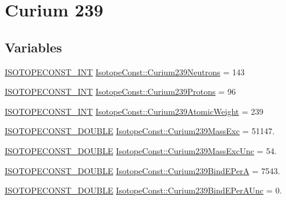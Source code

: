\hypertarget{group___isotope_const-_curium-_cm239}{}\section{Curium 239}
\label{group___isotope_const-_curium-_cm239}
\subsection*{Variables}
\begin{DoxyCompactItemize}
\item 
\mbox{\hyperlink{group___isotope_const-_macros_ga5f18360b3e99483a35c32d789e62621c}{I\+S\+O\+T\+O\+P\+E\+C\+O\+N\+S\+T\+\_\+\+I\+NT}} \mbox{\hyperlink{group___isotope_const-_curium-_cm239_ga4d16c2e40a65487af7b28052aaa3e91a}{Isotope\+Const\+::\+Curium239\+Neutrons}} = 143
\item 
\mbox{\hyperlink{group___isotope_const-_macros_ga5f18360b3e99483a35c32d789e62621c}{I\+S\+O\+T\+O\+P\+E\+C\+O\+N\+S\+T\+\_\+\+I\+NT}} \mbox{\hyperlink{group___isotope_const-_curium-_cm239_gae6e16ea3bcd3d07f73e7ccc0e0e9c6c1}{Isotope\+Const\+::\+Curium239\+Protons}} = 96
\item 
\mbox{\hyperlink{group___isotope_const-_macros_ga5f18360b3e99483a35c32d789e62621c}{I\+S\+O\+T\+O\+P\+E\+C\+O\+N\+S\+T\+\_\+\+I\+NT}} \mbox{\hyperlink{group___isotope_const-_curium-_cm239_gab6076bec8f7546423c6b9fc27a11d876}{Isotope\+Const\+::\+Curium239\+Atomic\+Weight}} = 239
\item 
\mbox{\hyperlink{group___isotope_const-_macros_ga8f45a7272ce02c0b4c65c44636ed719a}{I\+S\+O\+T\+O\+P\+E\+C\+O\+N\+S\+T\+\_\+\+D\+O\+U\+B\+LE}} \mbox{\hyperlink{group___isotope_const-_curium-_cm239_gad31a4579e486348872be9a7c6dd2fc46}{Isotope\+Const\+::\+Curium239\+Mass\+Exc}} = 51147.
\item 
\mbox{\hyperlink{group___isotope_const-_macros_ga8f45a7272ce02c0b4c65c44636ed719a}{I\+S\+O\+T\+O\+P\+E\+C\+O\+N\+S\+T\+\_\+\+D\+O\+U\+B\+LE}} \mbox{\hyperlink{group___isotope_const-_curium-_cm239_ga78b1a88b197b8cea621189063066bd16}{Isotope\+Const\+::\+Curium239\+Mass\+Exc\+Unc}} = 54.
\item 
\mbox{\hyperlink{group___isotope_const-_macros_ga8f45a7272ce02c0b4c65c44636ed719a}{I\+S\+O\+T\+O\+P\+E\+C\+O\+N\+S\+T\+\_\+\+D\+O\+U\+B\+LE}} \mbox{\hyperlink{group___isotope_const-_curium-_cm239_ga02098a3bf9ff388185ec985fa8b89f1b}{Isotope\+Const\+::\+Curium239\+Bind\+E\+PerA}} = 7543.
\item 
\mbox{\hyperlink{group___isotope_const-_macros_ga8f45a7272ce02c0b4c65c44636ed719a}{I\+S\+O\+T\+O\+P\+E\+C\+O\+N\+S\+T\+\_\+\+D\+O\+U\+B\+LE}} \mbox{\hyperlink{group___isotope_const-_curium-_cm239_ga339b1c5cb746c903db357027afbc1e31}{Isotope\+Const\+::\+Curium239\+Bind\+E\+Per\+A\+Unc}} = 0.

\end{DoxyCompactItemize}

